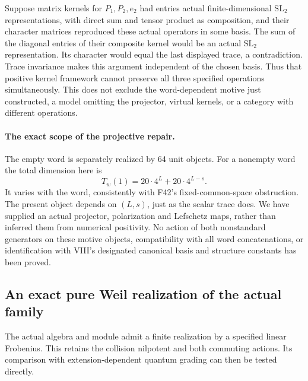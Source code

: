 \documentclass[11pt,a4paper]{article}
\newcommand{\fid}[1]{\textsf{#1}}\newcommand{\gate}[1]{\textsf{#1}}
\theoremstyle{named}\newtheorem{finding}{Finding}[section]
\theoremstyle{definition}\newtheorem{definition}[finding]{Definition}
\theoremstyle{remark}\newtheorem{remark}[finding]{Remark}
\begin{document}
Suppose matrix kernels for $P_1,P_2,e_2$ had entries actual
finite-dimensional $\mathrm{SL}_2$ representations, with direct
sum and tensor product as composition, and their character
matrices reproduced these actual operators in some basis.
The sum of the diagonal entries of their composite kernel would
be an actual $\mathrm{SL}_2$ representation. Its character would
equal the last displayed trace, a contradiction. Trace invariance
makes this argument independent of the chosen basis.
Thus that positive kernel framework cannot preserve all three
specified operations simultaneously. This does not exclude the
word-dependent motive just constructed, a model omitting the
projector, virtual kernels, or a category with different operations.

\paragraph{The exact scope of the projective repair.}
The empty word is separately realized by 64 unit objects.
For a nonempty word the total dimension here is
\[
 T_w(1)=20\cdot4^L+20\cdot4^{L-s}.
\]
It varies with the word, consistently with \fid{F42}'s
fixed-common-space obstruction. The present object depends on
$(L,s)$, just as the scalar trace does. We have supplied an actual
projector, polarization and Lefschetz maps, rather than inferred
them from numerical positivity. No action of both nonstandard
generators on these motive objects, compatibility with all word
concatenations, or identification with VIII's designated canonical
basis and structure constants has been proved.


\subsection{An exact pure Weil realization of the actual family}
The actual algebra and module admit a finite realization by a
specified linear Frobenius. This retains the collision nilpotent
and both commuting actions. Its comparison with extension-dependent
quantum grading can then be tested directly.
\end{document}
